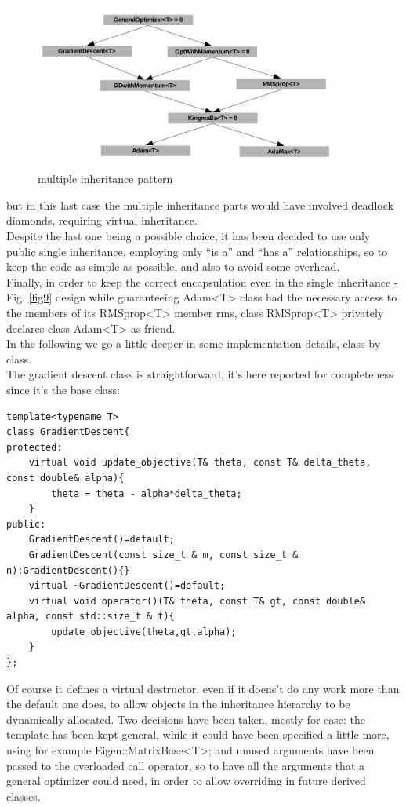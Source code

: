 \documentclass[12pt, a4paper]{report}
\theoremstyle{definition}
\begin{document}
\begin{figure}[H]
	\centering
	\includegraphics[width=0.9\textwidth]{img/classes2}
	\caption{multiple inheritance pattern}
\end{figure}
\noindent but in this last case the multiple inheritance parts would have involved deadlock diamonds, requiring virtual inheritance.\\
Despite the last one being a possible choice, it has been decided to use only public single inheritance, employing only ``is a'' and ``has a'' relationships, so to keep the code as simple as possible, and also to avoid some overhead.\\
Finally, in order to keep the correct encapsulation even in the single inheritance - Fig. \ref{fig9} design while guaranteeing {\ttfamily Adam<T>} class had the necessary access to the members of its {\ttfamily RMSprop<T>} member {\ttfamily rms}, class {\ttfamily RMSprop<T>} privately declares class {\ttfamily Adam<T>} as friend.\\
\newline \noindent In the following we go a little deeper in some implementation details, class by class.\\
The gradient descent class is straightforward, it's here reported for completeness since it's the base class:
\begin{lstlisting}[frame=single]
template<typename T>
class GradientDescent{
protected:
	virtual void update_objective(T& theta, const T& delta_theta, const double& alpha){
		theta = theta - alpha*delta_theta;  
	}
public:
	GradientDescent()=default;
	GradientDescent(const size_t & m, const size_t & n):GradientDescent(){}
	virtual ~GradientDescent()=default;
	virtual void operator()(T& theta, const T& gt, const double& alpha, const std::size_t & t){
		update_objective(theta,gt,alpha);
	}
};
\end{lstlisting}
\noindent Of course it defines a virtual destructor, even if it doens't do any work more than the default one does, to allow objects in the inheritance hierarchy to be dynamically allocated. Two decisions have been taken, mostly for ease: the template has been kept general, while it could have been specified a little more, using for example {\ttfamily Eigen::MatrixBase<T>}; and unused arguments have been passed to the overloaded call operator, so to have all the arguments that a general optimizer could need, in order to allow overriding in future derived classes.\\
\end{document}
